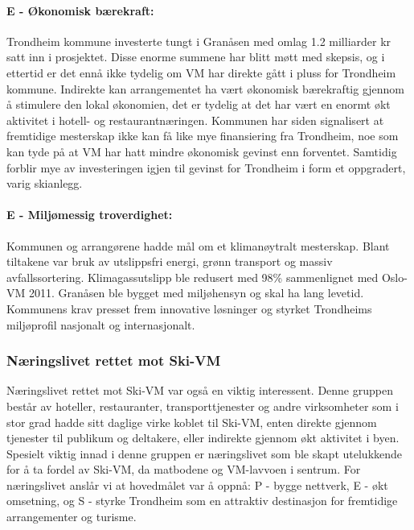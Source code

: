 \paragraph{E - Økonomisk bærekraft:} Trondheim kommune investerte tungt i Granåsen med omlag 1.2 
milliarder kr satt inn i prosjektet\parencite{NRK12Milliarder}. Disse enorme summene har blitt møtt med skepsis,
og i ettertid er det ennå ikke tydelig om VM har direkte gått i pluss for Trondheim kommune\parencite{AftenpostenNyVM}.
Indirekte kan arrangementet ha vært økonomisk bærekraftig gjennom å stimulere den lokal
økonomien, det er tydelig at det har vært en enormt økt aktivitet i hotell- og
restaurantnæringen\parencite{DagbladetPriser}. Kommunen har siden signalisert at fremtidige mesterskap ikke
kan få like mye finansiering fra Trondheim\parencite{NeaRadioVM}, noe som kan tyde på at VM har hatt mindre økonomisk
gevinst enn forventet. Samtidig forblir mye av investeringen igjen til gevinst for Trondheim i form
et oppgradert, varig skianlegg.

\paragraph{E - Miljømessig troverdighet:} Kommunen og arrangørene hadde mål om et klimanøytralt 
mesterskap\parencite{TrondheimKommuneVM}. Blant tiltakene var bruk av utslippsfri energi, grønn 
transport og massiv avfallssortering. Klimagassutslipp ble redusert med 98\% sammenlignet 
med Oslo-VM 2011\parencite{Trondheim2025Kutt}. Granåsen ble bygget med miljøhensyn og skal ha lang levetid. 
Kommunens krav presset frem innovative løsninger og styrket Trondheims miljøprofil nasjonalt og internasjonalt.

\subsubsection{Næringslivet rettet mot Ski-VM}
Næringslivet rettet mot Ski-VM var også en viktig interessent. Denne gruppen består av 
hoteller, restauranter, transporttjenester og andre virksomheter som i stor grad hadde sitt 
daglige virke koblet til Ski-VM, enten direkte gjennom tjenester til publikum og deltakere, 
eller indirekte gjennom økt aktivitet i byen. Spesielt viktig innad i denne gruppen er 
næringslivet som ble skapt utelukkende for å ta fordel av Ski-VM, da matbodene og VM-lavvoen 
i sentrum. For næringslivet anslår vi at hovedmålet var å oppnå: P - bygge nettverk, E - økt omsetning, og S - styrke Trondheim som en attraktiv destinasjon for fremtidige arrangementer og turisme.

